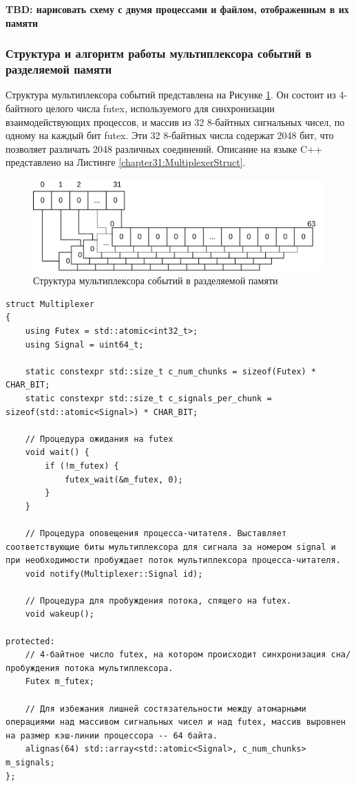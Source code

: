 \textbf{TBD: нарисовать схему с двумя процессами и файлом, отображенным в их памяти}

\subsubsection{Структура и алгоритм работы мультиплексора событий в разделяемой памяти}\label{chapter31:MuxStructure}

Структура мультиплексора событий представлена на Рисунке \ref{chapter31:MuxZeroState}. Он состоит из 4-байтного целого числа futex, используемого для синхронизации взаимодействующих процессов, и массив из 32 8-байтных сигнальных чисел, по одному на каждый бит futex. Эти 32 8-байтных числа содержат 2048 бит, что позволяет различать 2048 различных соединений. Описание на языке C++ представлено на Листинге \ref{chapter31:MultiplexerStruct}.


\begin{figure}[!h]
\caption{Структура мультиплексора событий в разделяемой памяти}
\label{chapter31:MuxZeroState}
\includegraphics[width=\textwidth]{../../graphics/schemes/futex}
\end{figure}

\begin{lstlisting}[float=!h,caption={Структура мультиплексора в памяти},label={chapter31:MultiplexerStruct},frame=tlrb]
struct Multiplexer
{
    using Futex = std::atomic<int32_t>;
    using Signal = uint64_t;

    static constexpr std::size_t c_num_chunks = sizeof(Futex) * CHAR_BIT;
    static constexpr std::size_t c_signals_per_chunk = sizeof(std::atomic<Signal>) * CHAR_BIT;
	
	// Процедура ожидания на futex
    void wait() {
    	if (!m_futex) {
   			futex_wait(&m_futex, 0);
   		}
    }
	
	// Процедура оповещения процесса-читателя. Выставляет соответствующие биты мультиплексора для сигнала за номером signal и при необходимости пробуждает поток мультиплексора процесса-читателя.
    void notify(Multiplexer::Signal id);
    
    // Процедура для пробуждения потока, спящего на futex.
    void wakeup();

protected:
	// 4-байтное число futex, на котором происходит синхронизация сна/пробуждения потока мультиплексора.
    Futex m_futex;
	
	// Для избежания лишней состязательности между атомарными операциями над массивом сигнальных чисел и над futex, массив выровнен на размер кэш-линии процессора -- 64 байта.
    alignas(64) std::array<std::atomic<Signal>, c_num_chunks> m_signals;
};
\end{lstlisting}

